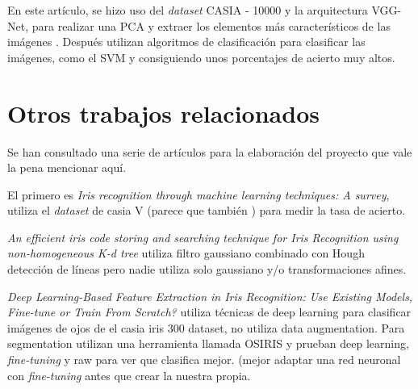 En este artículo\cite{minaee_experimental_2017}, se hizo uso del \textit{dataset} CASIA - 10000 y la arquitectura VGG-Net, para realizar una PCA y extraer los elementos
más característicos de las imágenes . Después utilizan algoritmos de clasificación para clasificar las imágenes, como el SVM y consiguiendo unos porcentajes de acierto muy altos.

\section{Otros trabajos relacionados}

Se han consultado una serie de artículos para la elaboración del proyecto que vale la pena mencionar aquí.

El primero es \textit{Iris recognition through machine learning techniques: A survey}\cite{DeMarsico2016IrisRT}, utiliza el \textit{dataset} de casia V (parece que también \cite{10.1016/j.cogsys.2018.09.029}) para medir la tasa de acierto.

\textit{An efficient iris code storing and searching technique for Iris Recognition using non-homogeneous K-d tree}\cite{7498983} utiliza filtro gaussiano combinado con Hough detección de líneas pero nadie utiliza solo gaussiano y/o transformaciones afines.

\textit{Deep Learning-Based Feature Extraction in Iris Recognition: Use Existing Models, Fine-tune or Train From Scratch?}\cite{boyd_deep_2020} utiliza técnicas de deep learning para clasificar imágenes de ojos de el casia iris 300 dataset, no utiliza data augmentation. Para segmentation utilizan una herramienta  llamada OSIRIS y prueban deep learning, \textit{fine-tuning} y raw para ver que clasifica mejor. (mejor adaptar una red neuronal con \textit{fine-tuning} antes que crear la nuestra propia.
